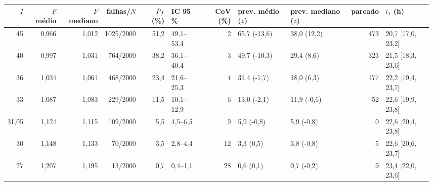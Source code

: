 \begin{tabular}{rrrrrlrllrl}
\toprule
$I$ & $F$ médio & $F$ mediano & falhas/$N$ & $P_f$ (\%) & IC 95\,\% & CoV (\%) & prev. médio ($z$) & prev. mediano ($z$) & pareado & $t_1$ (h)\\
\midrule
45 & 0{,}966 & 1{,}012 & 1025/2000 & 51{,}2 & 49{,}1--53{,}4 & 2 & 65{,}7 (-13{,}6) & 38{,}0 (12{,}2) & 473 & 20{,}7 [17{,}0, 23{,}2]\\
40 & 0{,}997 & 1{,}031 & 764/2000 & 38{,}2 & 36{,}1--40{,}4 & 3 & 49{,}7 (-10{,}3) & 29{,}4 (8{,}6) & 323 & 21{,}5 [18{,}3, 23{,}6]\\
36 & 1{,}034 & 1{,}061 & 468/2000 & 23{,}4 & 21{,}6--25{,}3 & 4 & 31{,}4 (-7{,}7) & 18{,}0 (6{,}3) & 177 & 22{,}2 [19{,}4, 23{,}7]\\
33 & 1{,}087 & 1{,}083 & 229/2000 & 11{,}5 & 10{,}1--12{,}9 & 6 & 13{,}0 (-2{,}1) & 11{,}9 (-0{,}6) & 52 & 22{,}6 [19{,}9, 23{,}8]\\
31{,}05 & 1{,}124 & 1{,}115 & 109/2000 & 5{,}5 & 4{,}5--6{,}5 & 9 & 5{,}9 (-0{,}8) & 5{,}9 (-0{,}8) & 0 & 22{,}6 [20{,}4, 23{,}8]\\
30 & 1{,}148 & 1{,}133 & 70/2000 & 3{,}5 & 2{,}8--4{,}4 & 12 & 3{,}3 (0{,}5) & 3{,}8 (-0{,}8) & 5 & 22{,}6 [20{,}6, 23{,}7]\\
27 & 1{,}207 & 1{,}195 & 13/2000 & 0{,}7 & 0{,}4--1{,}1 & 28 & 0{,}6 (0{,}1) & 0{,}7 (-0{,}2) & 9 & 23{,}4 [22{,}0, 23{,}6]\\
\bottomrule
\end{tabular}
